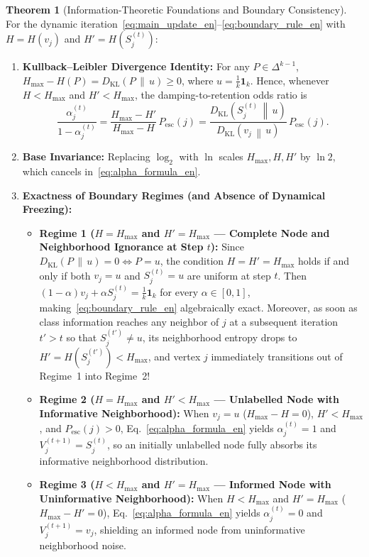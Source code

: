 \documentclass[11pt, a4paper]{article}
\theoremstyle{definition}
\newtheorem{theoremEN}{Theorem}
\theoremstyle{definition}
\begin{document}
\begin{theoremEN}[Information-Theoretic Foundations and Boundary Consistency]\label{thm:main_en}
For the dynamic iteration~\eqref{eq:main_update_en}--\eqref{eq:boundary_rule_en} with $H = H(v_j)$ and $H' = H(S_j^{(t)})$:
\begin{enumerate}[label=(\roman*)]
\item \textbf{Kullback--Leibler Divergence Identity:} For any $P \in \Delta^{k-1}$, $H_{\max} - H(P) = D_{\mathrm{KL}}(P \,\|\, u) \ge 0$, where $u = \frac{1}{k}\mathbf{1}_k$. Hence, whenever $H < H_{\max}$ and $H' < H_{\max}$, the damping-to-retention odds ratio is
\begin{equation}\label{eq:odds_kl_en}
\frac{\alpha_j^{(t)}}{1 - \alpha_j^{(t)}} = \frac{H_{\max} - H'}{H_{\max} - H}\,P_{\mathrm{esc}}(j) = \frac{D_{\mathrm{KL}}\!\left(S_j^{(t)} \,\middle\|\, u\right)}{D_{\mathrm{KL}}\!\left(v_j \,\middle\|\, u\right)}\,P_{\mathrm{esc}}(j).
\end{equation}
\item \textbf{Base Invariance:} Replacing $\log_2$ with $\ln$ scales $H_{\max}, H, H'$ by $\ln 2$, which cancels in~\eqref{eq:alpha_formula_en}.
\item \textbf{Exactness of Boundary Regimes (and Absence of Dynamical Freezing):}
\begin{itemize}
\item \textbf{Regime 1 ($H = H_{\max}$ and $H' = H_{\max}$ --- Complete Node and Neighborhood Ignorance at Step $t$):} Since $D_{\mathrm{KL}}(P \,\|\, u) = 0 \iff P = u$, the condition $H = H' = H_{\max}$ holds if and only if both $v_j = u$ and $S_j^{(t)} = u$ are uniform at step $t$. Then $(1-\alpha)v_j + \alpha S_j^{(t)} = \frac{1}{k}\mathbf{1}_k$ for every $\alpha \in [0,1]$, making~\eqref{eq:boundary_rule_en} algebraically exact. Moreover, as soon as class information reaches any neighbor of $j$ at a subsequent iteration $t' > t$ so that $S_j^{(t')} \ne u$, its neighborhood entropy drops to $H' = H(S_j^{(t')}) < H_{\max}$, and vertex $j$ immediately transitions out of Regime~1 into Regime~2!
\item \textbf{Regime 2 ($H = H_{\max}$ and $H' < H_{\max}$ --- Unlabelled Node with Informative Neighborhood):} When $v_j = u$ ($H_{\max} - H = 0$), $H' < H_{\max}$, and $P_{\mathrm{esc}}(j) > 0$, Eq.~\eqref{eq:alpha_formula_en} yields $\alpha_j^{(t)} = 1$ and $V_j^{(t+1)} = S_j^{(t)}$, so an initially unlabelled node fully absorbs its informative neighborhood distribution.
\item \textbf{Regime 3 ($H < H_{\max}$ and $H' = H_{\max}$ --- Informed Node with Uninformative Neighborhood):} When $H < H_{\max}$ and $H' = H_{\max}$ ($H_{\max} - H' = 0$), Eq.~\eqref{eq:alpha_formula_en} yields $\alpha_j^{(t)} = 0$ and $V_j^{(t+1)} = v_j$, shielding an informed node from uninformative neighborhood noise.
\end{itemize}
\end{enumerate}
\end{theoremEN}
\end{document}
